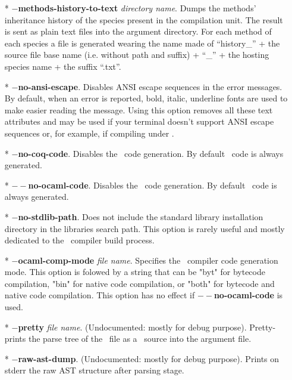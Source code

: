 \begin{itemize}
 \item[*] {\bf $-$methods-history-to-text} {\em directory
   name}. Dumps the methods' inheritance history of the species
   present in the compilation unit. The result is sent as plain text files
   into the argument directory. For each method of each species a file
   is generated wearing the name made of ``history\_'' + the source
   file base name (i.e. without path and suffix) + ``\_'' + the
   hosting species name + the suffix ``.txt''.

  \item[*] {\bf $-$no-ansi-escape}. Disables ANSI escape sequences in
    the error messages. By default, when an error is reported, bold,
    italic, underline fonts are used to make easier reading the
    message. Using this option removes all these text attributes and
    may be used if your terminal doesn't support ANSI escape sequences
    or, for example, if compiling under \emacs.

  \item[*] {\bf $-$no-coq-code}. Disables the \coq\ code
    generation. By default \coq\ code is always generated.

  \item[*] {\bf $--$no-ocaml-code}. Disables the \ocaml\ code
    generation. By default \ocaml\ code is always generated.

   \item[*] {\bf $-$no-stdlib-path}. Does not include the standard
    library installation directory in the libraries search path. This
    option is rarely useful and mostly dedicated to the
    \focal\ compiler build process.

   \item[*] {\bf $-$ocaml-comp-mode} {\em file name}. Specifies the
     \ocaml\ compiler code generation mode. This option is folowed by
     a string that can be "byt" for bytecode compilation, "bin" for
     native code compilation, or "both" for bytecode and native code
     compilation. This option has no effect if {\bf $--$no-ocaml-code}
     is used.

  \item[*] {\bf $-$pretty} {\em file name}. (Undocumented: mostly for
    debug purpose). Pretty-prints the parse tree of the \focal\ file
    as a \focal\ source into the argument file.

  \item[*] {\bf $-$raw-ast-dump}. (Undocumented: mostly for debug
    purpose). Prints on stderr the raw AST structure after parsing
    stage.


\end{itemize}

